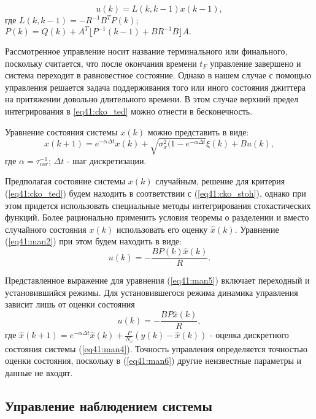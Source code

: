 \begin{equation}\label{eq41:man3}
u(k)=L(k,k-1)x(k-1),
\end{equation}
\noindent где $L(k,k-1)=-R^{-1}B^TP(k)$; $P(k)=Q(k)+A^T\lfloor P^{-1}(k-1)+BR^{-1}B\rfloor A.$

Рассмотренное управление носит название терминального или финального, поскольку считается, что после окончания времени $t_F$ управление завершено и система переходит в равновестное состояние.
Однако в нашем случае с помощью управления решается задача поддерживания того или иного состояния джиттера на притяжении довольно длительного времени. 
В этом случае верхний предел интегрирования в \ref{eq41:cko_ted} можно отнести в бесконечность.

Уравнение состояния системы $x(k)$ можно представить в виде:
\begin{equation}\label{eq41:man4}
x(k+1)=e^{-\alpha \Delta t}x(k)+\sqrt{\sigma^2_x(1-e^{-\alpha \Delta t}}\xi(k)+Bu(k),
\end{equation}
\noindent где $\alpha=\tau^{-1}_{cor}$; $\Delta t$ - шаг дискретизации.

Предполагая состояние системы $x(k)$ случайным, решение для критерия (\ref{eq41:cko_ted}) будем находить в соответствии с (\ref{eq41:cko_stoh}), однако при этом придется использовать специальные методы интегрирования стохастических функций.
Более рационально применить условия теоремы о разделении и вместо случайного состояния $x(k)$ использовать его оценку $\hat{x}(k)$. Уравнение (\ref{eq41:man2}) при этом будем находить в виде:
\begin{equation}\label{eq41:man5}
u(k)=-\frac{BP(k)\hat{x}(k)}{R}.
\end{equation}

Представленное выражение для уравнения (\ref{eq41:man5})  включает переходный и установившийся режимы. Для установившегося режима динамика управления зависит лишь от оценки состояния
\begin{equation}\label{eq41:man6}
u(k)=-\frac{BP\hat{x}(k)}{R},
\end{equation}
\noindent где $\hat x (k+1)=e^{-\alpha \Delta t}\hat x(k)+\frac{P}{N_\nu}(y(k)-\hat x(k))$ - оценка дискретного состояния системы (\ref{eq41:man4}).
Точность управления определяется точностью оценки состояния, поскольку в (\ref{eq41:man6}) другие неизвестные параметры и данные не входят.

\subsection{Управление наблюдением системы}

